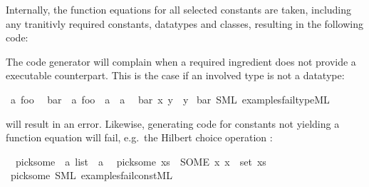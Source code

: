 \begin{isabellebody}
\begin{isamarkuptext}
  Internally, the function equations for all selected
  constants are taken, including any tranitivly required
  constants, datatypes and classes, resulting in the following
  code:


  The code generator will complain when a required
  ingredient does not provide a executable counterpart.
  This is the case if an involved type is not a datatype:%
\end{isamarkuptext}%
\isamarkuptrue%
%
\isadelimML
%
\endisadelimML
%
\isatagML
%
\endisatagML
{\isafoldML}%
%
\isadelimML
\isanewline
%
\endisadelimML
{}\isamarkupfalse%
\ {\isacharprime}a\ foo\isanewline
\isanewline
{}\isamarkupfalse%
\isanewline
\ \ bar\ {\isacharcolon}{\isacharcolon}\ {\isachardoublequoteopen}{\isacharprime}a\ foo\ {\isasymRightarrow}\ {\isacharprime}a\ {\isasymRightarrow}\ {\isacharprime}a{\isachardoublequoteclose}\isanewline
\ \ {\isachardoublequoteopen}bar\ x\ y\ {\isacharequal}\ y{\isachardoublequoteclose}\isanewline
%
\isadelimML
%
\endisadelimML
%
\isatagML
%
\endisatagML
{\isafoldML}%
%
\isadelimML
%
\endisadelimML
\isanewline
{}\isamarkupfalse%
\ bar\ {\isacharparenleft}SML\ {\isachardoublequoteopen}examples{\isacharslash}fail{\isacharunderscore}type{\isachardot}ML{\isachardoublequoteclose}{\isacharparenright}%
\begin{isamarkuptext}%
\noindent will result in an error. Likewise, generating code
  for constants not yielding
  a function equation will fail, e.g.~the Hilbert choice
  operation :%
\end{isamarkuptext}%
\isamarkuptrue%
%
\isadelimML
%
\endisadelimML
%
\isatagML
%
\endisatagML
{\isafoldML}%
%
\isadelimML
\isanewline
%
\endisadelimML
{}\isamarkupfalse%
\isanewline
\ \ pick{\isacharunderscore}some\ {\isacharcolon}{\isacharcolon}\ {\isachardoublequoteopen}{\isacharprime}a\ list\ {\isasymRightarrow}\ {\isacharprime}a{\isachardoublequoteclose}\isanewline
\ \ {\isachardoublequoteopen}pick{\isacharunderscore}some\ xs\ {\isacharequal}\ {\isacharparenleft}SOME\ x{\isachardot}\ x\ {\isasymin}\ set\ xs{\isacharparenright}{\isachardoublequoteclose}\isanewline
%
\isadelimML
%
\endisadelimML
%
\isatagML
%
\endisatagML
{\isafoldML}%
%
\isadelimML
%
\endisadelimML
\isanewline
{}\isamarkupfalse%
\ pick{\isacharunderscore}some\ {\isacharparenleft}SML\ {\isachardoublequoteopen}examples{\isacharslash}fail{\isacharunderscore}const{\isachardot}ML{\isachardoublequoteclose}{\isacharparenright}%

\end{isabellebody}
